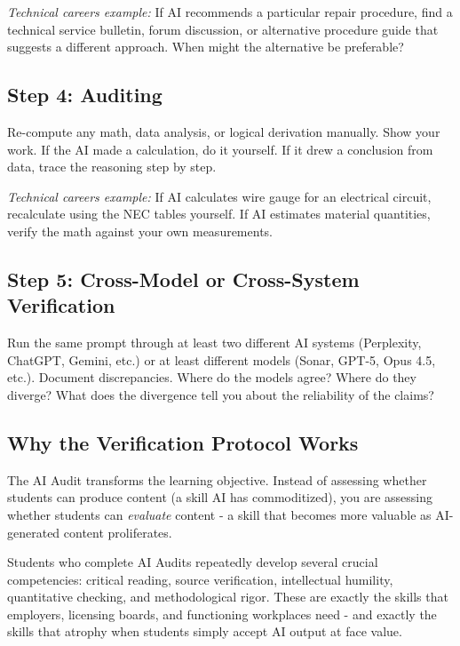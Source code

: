 \documentclass[
  letterpaper,
  DIV=11,
  numbers=noendperiod]{scrreprt}
\begin{document}
\emph{Technical careers example:} If AI recommends a particular repair
procedure, find a technical service bulletin, forum discussion, or
alternative procedure guide that suggests a different approach. When
might the alternative be preferable?

\subsection{Step 4: Auditing}\label{step-4-auditing}

Re-compute any math, data analysis, or logical derivation manually. Show
your work. If the AI made a calculation, do it yourself. If it drew a
conclusion from data, trace the reasoning step by step.

\emph{Technical careers example:} If AI calculates wire gauge for an
electrical circuit, recalculate using the NEC tables yourself. If AI
estimates material quantities, verify the math against your own
measurements.

\subsection{Step 5: Cross-Model or Cross-System
Verification}\label{step-5-cross-model-or-cross-system-verification}

Run the same prompt through at least two different AI systems
(Perplexity, ChatGPT, Gemini, etc.) or at least different models (Sonar,
GPT-5, Opus 4.5, etc.). Document discrepancies. Where do the models
agree? Where do they diverge? What does the divergence tell you about
the reliability of the claims?

\subsection{Why the Verification Protocol
Works}\label{why-the-verification-protocol-works}

The AI Audit transforms the learning objective. Instead of assessing
whether students can produce content (a skill AI has commoditized), you
are assessing whether students can \emph{evaluate} content - a skill
that becomes more valuable as AI-generated content proliferates.

Students who complete AI Audits repeatedly develop several crucial
competencies: critical reading, source verification, intellectual
humility, quantitative checking, and methodological rigor. These are
exactly the skills that employers, licensing boards, and functioning
workplaces need - and exactly the skills that atrophy when students
simply accept AI output at face value.
\end{document}
